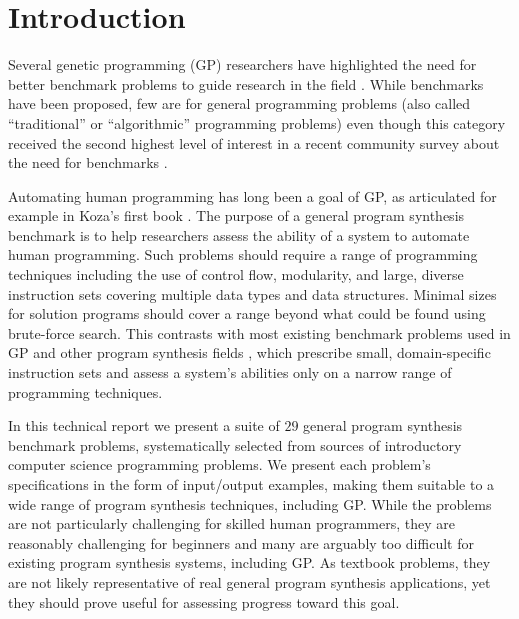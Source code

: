 \documentclass{sig-alternate}
\begin{document}




\section{Introduction}

Several genetic programming (GP) researchers have highlighted the need for better benchmark problems to guide research in the field \cite{McDermott:2012:GECCO, White:2013:BGB:2441218.2441242, Woodward:2014:GECCOcomp}. While benchmarks have been proposed, few are for general programming problems (also called ``traditional'' or ``algorithmic'' programming problems) even though this category received the second highest level of interest in a recent community survey about the need for benchmarks \cite{White:2013:BGB:2441218.2441242}. 

Automating human programming has long been a goal of GP, as articulated for example in Koza's first book \cite{koza:book}. The purpose of a general program synthesis benchmark is to help researchers assess the ability of a system to automate human programming. Such problems should require a range of programming techniques including the use of control flow, modularity, and large, diverse instruction sets covering multiple data types and data structures. Minimal sizes for solution programs should cover a range beyond what could be found using brute-force search. This contrasts with most existing benchmark problems used in GP and other program synthesis fields \cite{hofmann2009unifying}, which prescribe small, domain-specific instruction sets and assess a system's abilities only on a narrow range of programming techniques.

In this technical report we present a suite of $29$ general program synthesis benchmark problems, systematically selected from sources of introductory computer science programming problems. We present each problem's specifications in the form of input/output examples, making them suitable to a wide range of program synthesis techniques, including GP. While the problems are not particularly challenging for skilled human programmers, they are reasonably challenging for beginners and many are arguably too difficult for existing program synthesis systems, including GP. As textbook problems, they are not likely representative of real general program synthesis applications, yet they should prove useful for assessing progress toward this goal.
\end{document}
